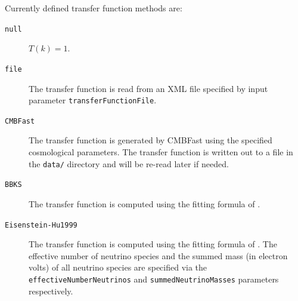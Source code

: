 Currently defined transfer function methods are:
\begin{description}
 \item [{\tt null}] $T(k)=1$.
 \item [{\tt file}] The transfer function is read from an XML file specified by input parameter {\tt transferFunctionFile}.
 \item [{\tt CMBFast}] The transfer function is generated by {\sc CMBFast} using the specified cosmological parameters. The transfer function is written out to a file in the {\tt data/} directory and will be re-read later if needed.
 \item [{\tt BBKS}] The transfer function is computed using the fitting formula of \cite{bardeen_statistics_1986}.
 \item [{\tt Eisenstein-Hu1999}] The transfer function is computed using the fitting formula of \cite{eisenstein_power_1999}. The effective number of neutrino species and the summed mass (in electron volts) of all neutrino species are specified via the {\tt effectiveNumberNeutrinos} and {\tt summedNeutrinoMasses} parameters respectively.
\end{description}

